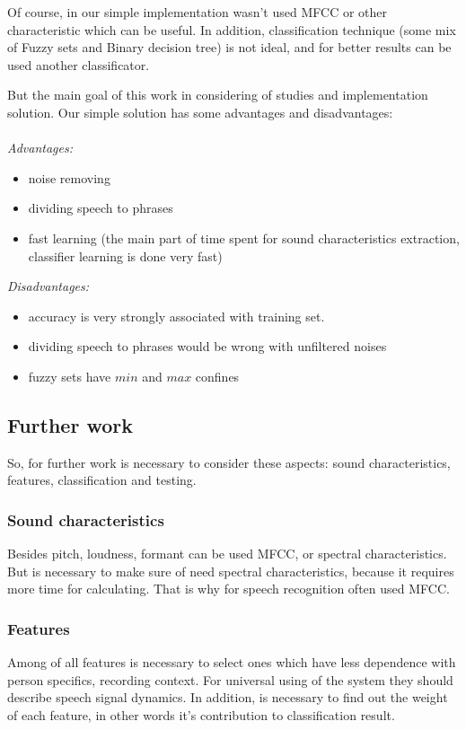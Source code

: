 \documentclass[14pt]{extarticle}
\begin{document}
Of course, in our simple implementation wasn't used MFCC or other characteristic which can be useful. In addition, classification technique (some mix of Fuzzy sets and Binary decision tree) is not ideal, and for better results can be used another classificator.

But the main goal of this work in considering of studies and implementation solution. Our simple solution has some advantages and disadvantages:\\\\
\textit{Advantages:}
\begin{itemize}
	\item noise removing
	\item dividing speech to phrases
	\item fast learning (the main part of time spent for sound characteristics extraction, classifier learning is done very fast)
\end{itemize}
\textit{Disadvantages:}
\begin{itemize}
	\item accuracy is very strongly associated with training set. 
	\item dividing speech to phrases would be wrong with unfiltered noises
	\item fuzzy sets have $min$ and $max$ confines
\end{itemize}

\subsection{Further work}
So, for further work is necessary to consider these aspects: sound characteristics, features, classification and testing.

\subsubsection{Sound characteristics}
Besides pitch, loudness, formant can be used MFCC, or spectral characteristics. But is necessary to  make sure of need spectral characteristics, because it requires more time for calculating. That is why for speech recognition often used MFCC.

\subsubsection{Features}
Among of all features is necessary to select ones which have less dependence with person specifics, recording context. For universal using of the system they should describe speech signal dynamics. In addition, is necessary to find out the weight of each feature, in other words it's contribution to classification result.
\end{document}
